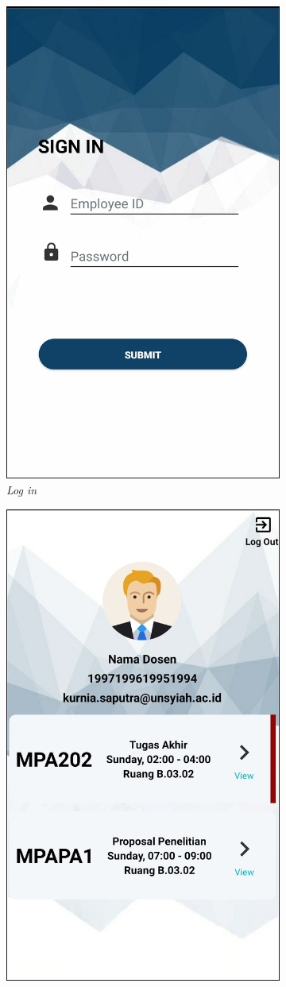 \begin{enumerate}[a.]
\begin{enumerate}[a.]
\begin{figure} [H]
\begin{subfigure}{.5\textwidth}
			      \includegraphics[width=.5\linewidth]{gambar/android/dosen-2}
			      \caption{\textit{Log in}}
		      \end{subfigure}
		      \vspace{1cm}
		      \newline
		      \begin{subfigure}{.5\textwidth}
			      \centering
			      \includegraphics[width=.5\linewidth]{gambar/android/dosen-3}

\end{subfigure}
\end{figure}
\end{enumerate}
\end{enumerate}

